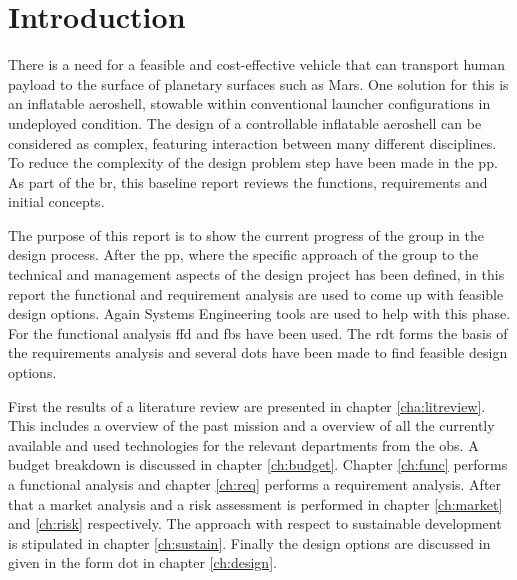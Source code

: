 \section{Introduction}\label{cha:introduction}
There is a need for a feasible and cost-effective vehicle that can transport human payload to the surface of planetary surfaces such as Mars. One solution for this is an inflatable aeroshell, stowable within conventional launcher configurations in undeployed condition. The design of a controllable inflatable aeroshell can be considered as complex, featuring interaction between many different disciplines. To reduce the complexity of the design problem step have been made in the \gls{pp}. As part of the \gls{br}, this baseline report reviews the functions, requirements and initial concepts.

The purpose of this report is to show the current progress of the group in the design process. After the \gls{pp}, where the specific approach of the group to the technical and management aspects of the design project has been defined, in this report the functional and requirement analysis are used to come up with feasible design options. Again Systems Engineering tools are used to help with this phase. For the functional analysis \gls{ffd} and \gls{fbs} have been used. The \gls{rdt} forms the basis of the requirements analysis and several \gls{dot}s have been made to find feasible design options.

First the results of a literature review are presented in chapter \ref{cha:litreview}. This includes a overview of the past mission and a overview of all the currently available and used technologies for the relevant departments from the \gls{obs}. A budget breakdown is discussed in chapter \ref{ch:budget}. Chapter \ref{ch:func} performs a functional analysis and chapter \ref{ch:req} performs a requirement analysis. After that a market analysis and a risk assessment is performed in chapter \ref{ch:market} and \ref{ch:risk} respectively. The approach with respect to sustainable development is stipulated in chapter \ref{ch:sustain}. Finally the design options are discussed in given in the form \gls{dot} in chapter \ref{ch:design}. 



